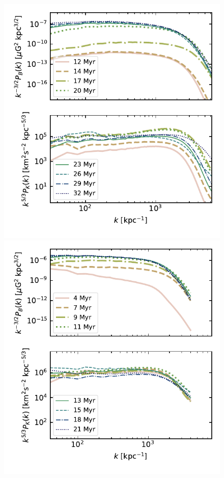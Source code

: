 \documentclass[preprint2]{aastex63}
\begin{document}
{%
\begin{figure}
  \includegraphics[trim=0.5cm 0.2cm 0.3cm 0.0cm, clip=true,width=\columnwidth]{figs/0_5pcPm0e-4_0kpower.pdf}
  \includegraphics[trim=0.5cm 0.5cm 0.3cm 0.0cm, clip=true,width=\columnwidth]{figs/bals256rkpower.pdf}

\end{figure}}
\end{document}
